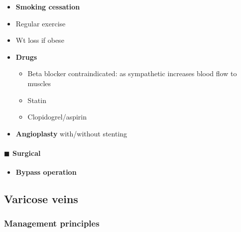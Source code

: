 \documentclass[
  14pt,
]{extarticle}
\providecommand{\tightlist}{%
  \setlength{\itemsep}{0pt}\setlength{\parskip}{0pt}}
\begin{document}
\begin{itemize}
\tightlist
\item
  \textbf{Smoking cessation}
\item
  Regular exercise
\item
  Wt loss if obese
\item
  \textbf{Drugs}

  \begin{itemize}
  \tightlist
  \item
    Beta blocker contraindicated: as sympathetic increases blood flow to
    muscles
  \item
    Statin
  \item
    Clopidogrel/aspirin
  \end{itemize}
\item
  \textbf{Angioplasty} with/without stenting
\end{itemize}

\hypertarget{blacksquare-surgical}{%
\paragraph{\texorpdfstring{\(\blacksquare\)
Surgical}{\textbackslash blacksquare Surgical}}\label{blacksquare-surgical}}

\begin{itemize}
\tightlist
\item
  \textbf{Bypass operation}
\end{itemize}

\pagebreak

\hypertarget{varicose-veins}{%
\subsection{Varicose veins}\label{varicose-veins}}

\hypertarget{management-principles}{%
\subsubsection{Management principles}\label{management-principles}}
\end{document}
